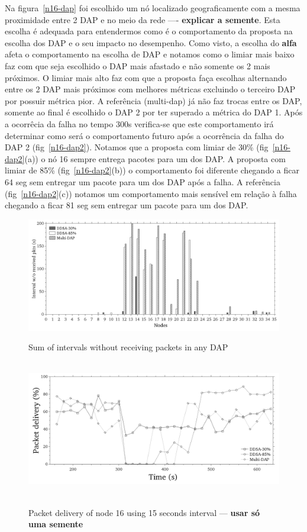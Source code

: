 \documentclass[conference]{IEEEtran}
\begin{document}
Na figura~\ref{n16-dap} foi escolhido um nó localizado geograficamente com a mesma proximidade entre 2 DAP e no meio da rede ---- \textbf{explicar a semente}. Esta escolha é adequada para entendermos como é o comportamento da proposta na escolha dos DAP e o seu impacto no desempenho. Como visto, a escolha do \textbf{alfa} afeta o comportamento na escolha de DAP e notamos como o limiar mais baixo faz com que seja escolhido o DAP mais afastado e não somente os 2 mais próximos. O limiar mais alto faz com que a proposta faça escolhas alternando entre os 2 DAP mais próximos  com melhores métricas excluindo o terceiro DAP por possuir métrica pior. A referência (multi-dap) já não faz trocas entre os DAP, somente ao final é escolhido o DAP 2 por ter superado a métrica do DAP 1. Após a ocorrêcia da falha no tempo 300s verifica-se que este comportamento irá determinar como será o comportamento futuro após a ocorrência da falha do DAP 2 (fig~\ref{n16-dap2}). Notamos que a proposta com limiar de 30\% (fig~\ref{n16-dap2}(a)) o nó 16 sempre  entrega pacotes para um dos DAP. A proposta com limiar de 85\% (fig~\ref{n16-dap2}(b)) o comportamento foi diferente chegando a ficar 64 seg sem entregar um pacote para um dos DAP após a falha. A referência (fig~\ref{n16-dap2}(c)) notamos um comportamento mais sensível em relação à falha chegando a ficar 81 seg sem entregar um pacote para um dos DAP.


\begin{figure}[ht]
  \centering
  \label{intv-dap}{\includegraphics[scale=.21]{IEEE-consolidados/G-wo-rcv-pkt.jpg}} 
  \caption{Sum of intervals without receiving packets in any DAP}
  \label{sum-intv}
\end{figure}



\begin{figure}[ht]
  \centering
  \mbox{
    \label{pdf-n16-per}{\includegraphics[scale=.21]{IEEE-consolidados/G-pdf-periodo-n16-2.jpg}}
  }
  \caption{Packet delivery of node 16 using 15 seconds interval --- \textbf{usar só uma semente}}
  \label{pdf-n16-per}
\end{figure}
\end{document}
